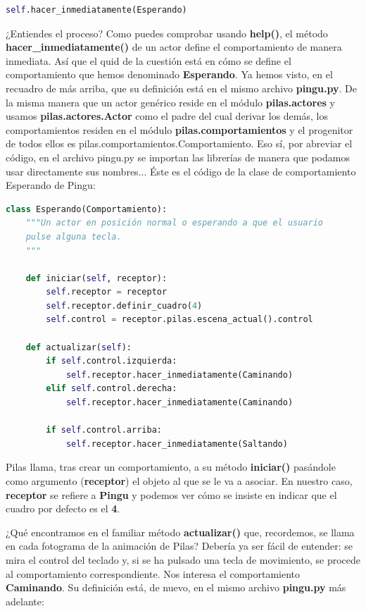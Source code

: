 \documentclass{article}
\begin{document}
\begin{lstlisting}[language=Python]
 self.hacer_inmediatamente(Esperando)
\end{lstlisting}
\vspace{\baselineskip}

¿Entiendes el proceso? Como puedes comprobar usando \textbf{help()}, el método \textbf{hacer\_inmediatamente()} de un
actor define el comportamiento de manera inmediata. Así que el quid de la cuestión está en
cómo se define el comportamiento que hemos denominado \textbf{Esperando}. Ya hemos visto,
en el recuadro de más arriba, que su definición está en el mismo archivo \textbf{pingu.py}.
De la misma manera que un actor genérico reside en el módulo \textbf{pilas.actores} y usamos
\textbf{pilas.actores.Actor} como el padre del cual derivar los demás, los comportamientos
residen en el módulo \textbf{pilas.comportamientos} y el progenitor de todos ellos es pilas.comportamientos.Comportamiento. Eso sí, por abreviar el código, en el
archivo pingu.py se importan las librerías de manera que podamos usar directamente sus
nombres... Éste es el código de la clase de comportamiento Esperando de Pingu:

\begin{lstlisting}[language=Python]
 class Esperando(Comportamiento):
    """Un actor en posición normal o esperando a que el usuario
    pulse alguna tecla.
    """

    def iniciar(self, receptor):
        self.receptor = receptor
        self.receptor.definir_cuadro(4)
        self.control = receptor.pilas.escena_actual().control

    def actualizar(self):
        if self.control.izquierda:
            self.receptor.hacer_inmediatamente(Caminando)
        elif self.control.derecha:
            self.receptor.hacer_inmediatamente(Caminando)

        if self.control.arriba:
            self.receptor.hacer_inmediatamente(Saltando)
\end{lstlisting}
\vspace{\baselineskip}

Pilas llama, tras crear un comportamiento, a su método \textbf{iniciar()} pasándole como argumento (\textbf{receptor}) el objeto al que se le va a asociar. En nuestro caso, \textbf{receptor} se refiere a \textbf{Pingu} y podemos ver cómo se insiste en indicar que el cuadro por defecto es el \textbf{4}.\par
¿Qué encontramos en el familiar método \textbf{actualizar()} que, recordemos, se llama en cada fotograma de la animación de Pilas? Debería ya ser fácil de entender: se mira el control del teclado y, si se ha pulsado una tecla de movimiento, se procede al comportamiento correspondiente. Nos interesa el comportamiento \textbf{Caminando}. Su definición está, de nuevo, en el mismo archivo \textbf{pingu.py} más adelante:
\end{document}
